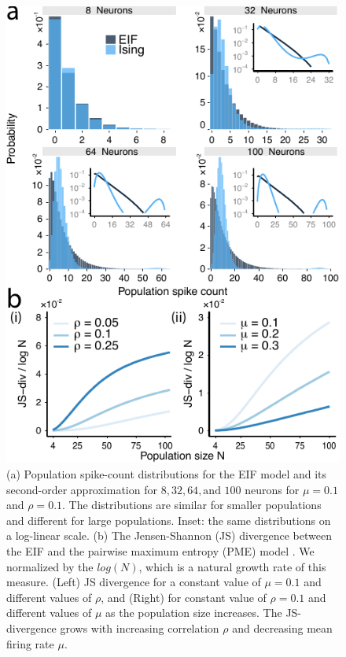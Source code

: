 \documentclass[%
 reprint,
 twocolumn,
 amsmath,amssymb,
 aps,
floatfix,
]{revtex4}
\begin{document}
\begin{figure}[h]
\includegraphics{figures/fig_2a.pdf}
\caption{\label{fig:eifising} %
(a) Population spike-count distributions for the EIF model and its second-order approximation for $8, 32, 64, \text{and } 100$ neurons for $\mu = 0.1$ and $\rho = 0.1$. The distributions are similar for smaller populations and different for large populations. Inset: the same distributions on a log-linear scale. (b) The Jensen-Shannon (JS) divergence between the EIF and the pairwise maximum entropy (PME) model .  We normalized by the $log(N)$, which is a natural growth rate of this measure. (Left) JS divergence for a constant value of $\mu = 0.1$ and different values of $\rho$, and (Right) for constant value of $\rho = 0.1$ and different values of $\mu$ as the population size increases. The JS-divergence grows with increasing correlation $\rho$ and decreasing mean firing rate $\mu$.}
\end{figure}
\end{document}

